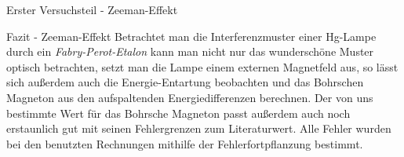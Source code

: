 \documentclass[pdftex, a4paper,11pt, twoside, ngerman]{report}
\begin{document}
\begin{chapter}{Erster Versuchsteil - Zeeman-Effekt}
    \begin{section}{Fazit - Zeeman-Effekt}
      \label{chp:ZeemanEffekt:sec:Fazit}
      Betrachtet man die Interferenzmuster einer Hg-Lampe durch ein
      \textit{Fabry-Perot-Etalon} kann man nicht nur das wunderschöne Muster
      optisch betrachten, setzt man die Lampe einem externen Magnetfeld aus,
      so lässt sich außerdem auch die Energie-Entartung beobachten und das
      Bohrschen Magneton aus den aufspaltenden Energiedifferenzen berechnen.
      Der von uns bestimmte Wert für das Bohrsche Magneton passt außerdem auch
      noch erstaunlich gut mit seinen Fehlergrenzen zum Literaturwert.
      Alle Fehler wurden bei den benutzten Rechnungen mithilfe der
      Fehlerfortpflanzung bestimmt.
    \end{section}
   
  \end{chapter}
 
 
 
\end{document}
